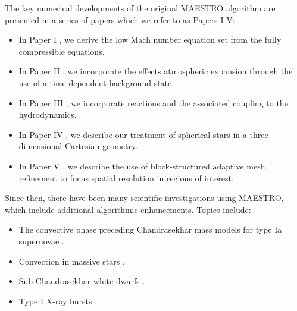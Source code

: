 The key numerical developments of the original MAESTRO algorithm are presented in a series of papers which we refer to as Papers I-V:
\begin{itemize}
\item In Paper I \citep{MAESTRO_I}, we derive the low Mach number equation set from the fully compressible equations.
\item In Paper II \citep{MAESTRO_II}, we incorporate the effects atmospheric expansion through the use of a time-dependent background state.
\item In Paper III \citep{MAESTRO_III}, we incorporate reactions and the associated coupling to the hydrodynamics.
\item In Paper IV \citep{MAESTRO_IV}, we describe our treatment of spherical stars in a three-dimensional Cartesian geometry.
\item In Paper V \citep{MAESTRO_V}, we describe the use of block-structured adaptive mesh refinement to focus spatial resolution in regions of interest.
\end{itemize} 

Since then, there have been many scientific investigations using MAESTRO, which include additional algorithmic enhancements.  Topics include:
\begin{itemize}
\item The convective phase preceding Chandrasekhar mass models for type Ia supernovae \citep{MAESTRO_convection,MAESTRO_AMR,MAESTRO_CASTRO}.
\item Convection in massive stars \citep{Gilet:2013}.
\item Sub-Chandrasekhar white dwarfs \citep{subChandra_I,subChandra_II}.
\item Type I X-ray bursts \citep{XRB_I,XRB_II,XRB_III}.
\end{itemize}

